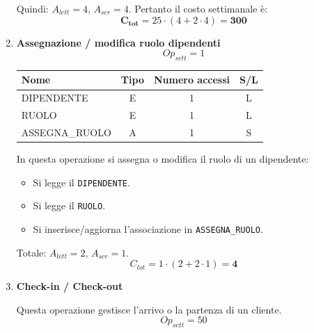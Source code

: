 \documentclass[a4paper,12pt]{report}
\begin{document}
\begin{enumerate}
	      Quindi: $A_{lett}=4$, $A_{scr}=4$.
	      Pertanto il costo settimanale è:
	      $$\mathbf{C_{tot}} = 25 \cdot (4 + 2 \cdot 4) = \mathbf{300}$$



	\item {\large \textbf{Assegnazione / modifica ruolo dipendenti}} \label{op12}
	      $$
		      Op_{sett} = 1
	      $$

	      \begin{table}[H]
		      \centering
		      \small
		      \renewcommand{\arraystretch}{1.15}
		      \begin{tabularx}{0.8\textwidth}{|X|c|c|c|}
			      \hline
			      \rowcolor{gray!20}
			      \textbf{Nome}  & \textbf{Tipo} & \textbf{Numero accessi} & \textbf{S/L} \\
			      \hline
			      DIPENDENTE     & E             & 1                       & L            \\
			      RUOLO          & E             & 1                       & L            \\
			      ASSEGNA\_RUOLO & A             & 1                       & S            \\
			      \hline
		      \end{tabularx}
	      \end{table}

	      In questa operazione si assegna o modifica il ruolo di un dipendente:
	      \begin{itemize}
		      \item Si legge il \texttt{DIPENDENTE}.
		      \item Si legge il \texttt{RUOLO}.
		      \item Si inserisce/aggiorna l'associazione in \texttt{ASSEGNA\_RUOLO}.
	      \end{itemize}

	      Totale: $A_{lett}=2$, $A_{scr}=1$.
	      \[
		      C_{tot} = 1 \cdot (2 + 2 \cdot 1) = \mathbf{4}
	      \]


	\item {\large \textbf{Check-in / Check-out}} \label{op13}

	      Questa operazione gestisce l'arrivo o la partenza di un cliente.
	      $$
		      Op_{sett} = 50
	      $$



\end{enumerate}
\end{document}

